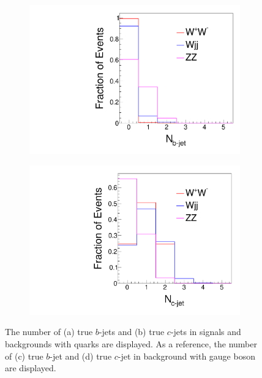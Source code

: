\documentclass[a4paper,11pt]{article}
\begin{document}
\begin{figure}[htbp]
\begin{subfigure}[t]{0.45\textwidth}
     \includegraphics[width=\linewidth]{nbjets_wz.pdf}
     \caption{}
     \label{fig:nbjets_wz}
  \end{subfigure}
  \begin{subfigure}[t]{0.45\textwidth}
     \includegraphics[width=\linewidth]{ncjets_wz.pdf}
     \caption{}
     \label{fig:ncjets_wz}
  \end{subfigure}
  \caption{The number of (a) true $b$-jets and (b) true $c$-jets in signals and backgrounds with quarks are displayed. As a reference, the number of (c) true $b$-jet and (d) true $c$-jet in background with gauge boson are displayed.}\label{fig:bcjet}
\end{figure}
\end{document}
